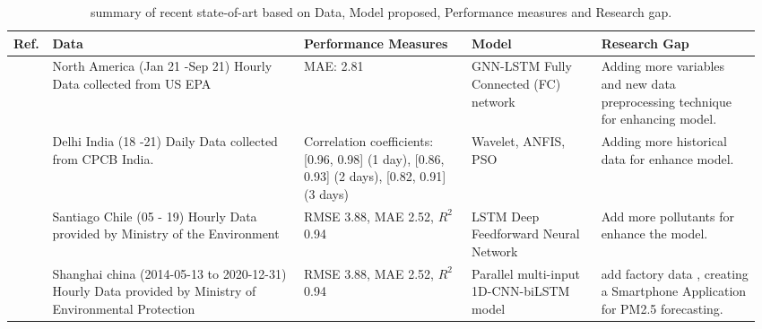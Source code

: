 \begin{landscape}
  \setlength{\tabcolsep}{3pt}

  {\renewcommand{\arraystretch}{1}%
  \begin{longtable}[h!]{ p{0.04\linewidth} p{0.33\linewidth} p{0.22\linewidth} p{0.17\linewidth} p{0.21\linewidth} }%
  \caption{summary of recent state-of-art based on Data,  Model proposed,  Performance measures and Research gap.}
  \label{t_lr}\\
  \hline
 Ref.                 & Data                                                                                                     & Performance Measures                                                                   & Model                                                               & Research Gap                                                       \\ \hline
  \endhead
  \hline
  \endfoot
  \endlastfoot
  \cite{li2023nested}                & North America (Jan 21 -Sep 21)   Hourly Data collected from US EPA                                       & MAE:  2.81                                                                                               & GNN-LSTM Fully Connected (FC) network                              & Adding more variables and new data preprocessing technique for enhancing model.                                    \\
  \cite{pruthi2022low}           & Delhi  India (18 -21) Daily Data collected from   CPCB India.                                            & Correlation coefficients:  {[}0.96, 0.98{]} (1   day),  {[}0.86, 0.93{]} (2 days),  {[}0.82, 0.91{]} (3 days) & Wavelet,  ANFIS,  PSO                                                 &  Adding more historical data for enhance model.                                                  \\
  \cite{menares2021forecasting}             & Santiago Chile (05 - 19) Hourly   Data provided by Ministry of the Environment                           & RMSE 3.88,  MAE 2.52,  $R^2$ 0.94                                                                            & LSTM Deep Feedforward Neural Network                               & Add more pollutants for enhance the model.               \\
 \cite{zhu2023investigation}            & Shanghai china (2014-05-13 to 2020-12-31)   Hourly Data provided by Ministry of Environmental Protection & RMSE 3.88,  MAE 2.52,  $R^2$ 0.94                                                                            & Parallel multi-input 1D-CNN-biLSTM   model                          & add  factory data ,  creating a Smartphone Application for PM2.5 forecasting.                                                         \\




\end{longtable}}
\end{landscape}
